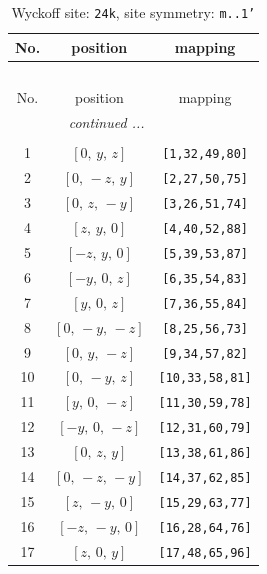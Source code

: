 \documentclass[fleqn,8pt]{jsarticle}
\begin{document}
\begin{longtable}{ccc}
\caption{Wyckoff site: {\tt 24k}, site symmetry: {\tt m..1'}}
 \\
 \hline \hline
No. & position & mapping \\ \hline \endfirsthead

\multicolumn{2}{l}{\tablename\ \thetable{}} \\
 \hline \hline
No. & position & mapping \\ \hline \endhead

 \hline \hline
\multicolumn{2}{r}{\footnotesize\it continued ...} \\ \endfoot

 \hline \hline
\multicolumn{2}{r}{} \\ \endlastfoot

1 & $\left[ 0,\, y,\, z \right]$ & {\tt [1,32,49,80]} \\ \hline
2 & $\left[ 0,\, - z,\, y \right]$ & {\tt [2,27,50,75]} \\ \hline
3 & $\left[ 0,\, z,\, - y \right]$ & {\tt [3,26,51,74]} \\ \hline
4 & $\left[ z,\, y,\, 0 \right]$ & {\tt [4,40,52,88]} \\ \hline
5 & $\left[ - z,\, y,\, 0 \right]$ & {\tt [5,39,53,87]} \\ \hline
6 & $\left[ - y,\, 0,\, z \right]$ & {\tt [6,35,54,83]} \\ \hline
7 & $\left[ y,\, 0,\, z \right]$ & {\tt [7,36,55,84]} \\ \hline
8 & $\left[ 0,\, - y,\, - z \right]$ & {\tt [8,25,56,73]} \\ \hline
9 & $\left[ 0,\, y,\, - z \right]$ & {\tt [9,34,57,82]} \\ \hline
10 & $\left[ 0,\, - y,\, z \right]$ & {\tt [10,33,58,81]} \\ \hline
11 & $\left[ y,\, 0,\, - z \right]$ & {\tt [11,30,59,78]} \\ \hline
12 & $\left[ - y,\, 0,\, - z \right]$ & {\tt [12,31,60,79]} \\ \hline
13 & $\left[ 0,\, z,\, y \right]$ & {\tt [13,38,61,86]} \\ \hline
14 & $\left[ 0,\, - z,\, - y \right]$ & {\tt [14,37,62,85]} \\ \hline
15 & $\left[ z,\, - y,\, 0 \right]$ & {\tt [15,29,63,77]} \\ \hline
16 & $\left[ - z,\, - y,\, 0 \right]$ & {\tt [16,28,64,76]} \\ \hline
17 & $\left[ z,\, 0,\, y \right]$ & {\tt [17,48,65,96]} \\ \hline

\end{longtable}
\end{document}
